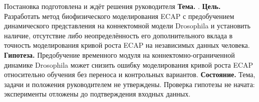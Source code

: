 \begin{frame}{Постановка подготовлена и ждёт решения руководителя}
\textbf{Тема.} \WorkingTitle.
\SlideGap
\textbf{Цель.} Разработать метод биофизического моделирования ECAP с предобучением динамического представления на коннектомной модели Drosophila и установить наличие, отсутствие либо неопределённость его дополнительного вклада в точность моделирования кривой роста ECAP на независимых данных человека.
\SlideGap
\textbf{Гипотеза.} Предобучение временного модуля на коннектомно-ограниченной динамике Drosophila может снизить ошибку моделирования кривой роста ECAP относительно обучения без переноса и контрольных вариантов.
\SlideGap
\textbf{Состояние.} Тема, задачи и положения руководителем не утверждены. Проверка гипотезы не начата: эксперименты отложены до подтверждения входных данных.
\end{frame}
